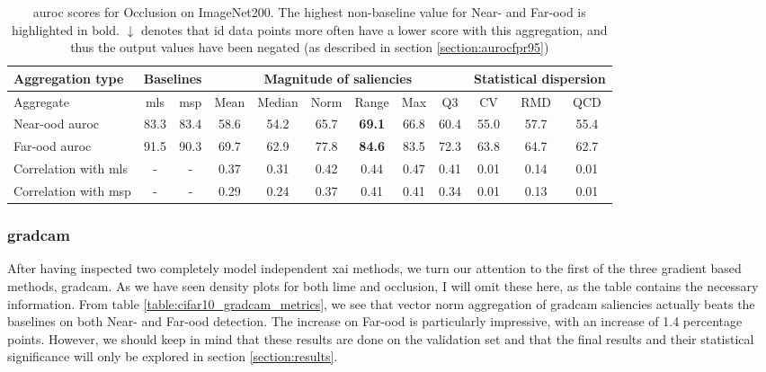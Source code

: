 \documentclass[UKenglish]{uiomasterthesis} %
\theoremstyle{definition}
\begin{document}
\begin{table}[H]
\setlength\tabcolsep{3pt}
\begin{center}
\begin{tabular}{ |p{5.1em}|c c|c c c c c c|c c c| }
    \hline
     \centering Aggregation type & \multicolumn{2}{c|}{Baselines} & \multicolumn{6}{c|}{Magnitude of saliencies} & \multicolumn{3}{p{8em}|}{\centering Statistical dispersion} \\
    \hline
    Aggregate & \ac{mls} & \ac{msp} & Mean & Median & Norm & Range & Max & Q3 & CV & RMD & QCD  \\
    \hline
    \rowcolor{near!50}
    Near-\ac{ood} \ac{auroc} & 83.3 & 83.4 & 58.6 & 54.2 & 65.7 &\textbf{ 69.1 }& 66.8 & 60.4 & 55.0 & 57.7 & 55.4  \\
    \hline
    \rowcolor{far!50}
    Far-\ac{ood} \ac{auroc} & 91.5 & 90.3 & 69.7 & 62.9 & 77.8 &\textbf{ 84.6 }& 83.5 & 72.3 & 63.8 & 64.7 & 62.7  \\
    \hline
    Correlation with \ac{mls}& - & - & 0.37 & 0.31 & 0.42 & 0.44 & 0.47 & 0.41 & 0.01 & 0.14 & 0.01  \\
    \hline
    Correlation with \ac{msp}& - & - & 0.29 & 0.24 & 0.37 & 0.41 & 0.41 & 0.34 & 0.01 & 0.13 & 0.01  \\
    \hline
    \end{tabular}
    \caption[\ac{auroc} scores for Occlusion on ImageNet200]{\ac{auroc} scores for Occlusion on ImageNet200. The highest non-baseline value for Near- and Far-\ac{ood} is highlighted in bold. $\downarrow$ denotes that \ac{id} data points more often have a lower score with this aggregation, and thus the output values have been negated (as described in section \ref{section:aurocfpr95})}
    \label{table:imagenet200_occlusion_metrics}
\end{center}
\setlength\tabcolsep{6pt}
\end{table}

\subsubsection{\ac{gradcam}}

After having inspected two completely model independent \ac{xai} methods, we turn our attention to the first of the three gradient based methods, \ac{gradcam}. As we have seen density plots for both \ac{lime} and occlusion, I will omit these here, as the table contains the necessary information. From table \ref{table:cifar10_gradcam_metrics}, we see that vector norm aggregation of \ac{gradcam} saliencies actually beats the baselines on both Near- and Far-\ac{ood} detection. The increase on Far-\ac{ood} is particularly impressive, with an increase of 1.4 percentage points. However, we should keep in mind that these results are done on the validation set and that the final results and their statistical significance will only be explored in section \ref{section:results}.
\end{document}
